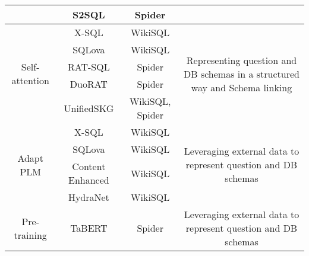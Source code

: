 \begin{table}
\begin{tabular}{|c|c|c|c|}
                                        & S2SQL               & Spider                    &                                                                                                            \\
        \hline
        \multirow{5}{*}{Self-attention} & X-SQL               & WikiSQL                   & \multirow{5}{*}{\parbox{5cm}{Representing question and DB schemas in a structured way and Schema linking}} \\
                                        & SQLova              & WikiSQL                   &                                                                                                            \\
                                        & RAT-SQL             & Spider                    &                                                                                                            \\
                                        & DuoRAT              & Spider                    &                                                                                                            \\
                                        & UnifiedSKG          & WikiSQL, Spider           &                                                                                                            \\
        \hline
        \multirow{4}{*}{Adapt PLM}      & X-SQL               & WikiSQL                   & \multirow{4}{*}{\parbox{5cm}{Leveraging external data to represent question and DB schemas}}               \\
                                        & SQLova              & WikiSQL                   &                                                                                                            \\
                                        & Content Enhanced    & WikiSQL                   &                                                                                                            \\
                                        & HydraNet            & WikiSQL                   &                                                                                                            \\
        \hline
        \multirow{3}{*}{Pre-training}   & TaBERT              & Spider                    & \multirow{3}{*}{\parbox{5cm}{Leveraging external data to represent question and DB schemas}}               \\

\end{tabular}
\end{table}
